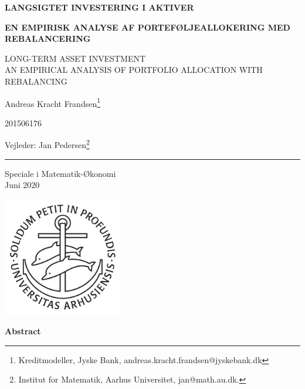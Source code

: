 \documentclass[
  a4paper,
  oneside]{memoir}
\author{}
\date{\vspace{-2.5em}}
\begin{document}
\begin{titlingpage}
\begin{center}
\LARGE \textbf{LANGSIGTET INVESTERING I AKTIVER}

\vspace{2mm}

\renewcommand{\thefootnote}{\fnsymbol{footnote}}
\large \textbf{EN EMPIRISK ANALYSE AF PORTEFØLJEALLOKERING MED REBALANCERING}

\tiny LONG-TERM ASSET INVESTMENT\\ AN EMPIRICAL ANALYSIS OF PORTFOLIO ALLOCATION WITH REBALANCING

\vspace{2mm}

\Large Andreas Kracht Frandsen\footnote{Kreditmodeller, Jyske Bank, andreas.kracht.frandsen@jyskebank.dk}

\Large 201506176

\Large Vejleder: Jan Pedersen\footnote{Institut for Matematik, Aarhus Universitet, jan@math.au.dk.}

\vspace{2mm}

\rule{1cm}{0.4pt}

\vspace{2mm}

Speciale i Matematik-Økonomi\\
Juni 2020

\vfill

\includegraphics[width=0.39\textwidth]{latex/ausegl_sort.pdf}

\vfill

\end{center}
\begin{center}
\textbf{Abstract}


\end{center}
\end{titlingpage}
\end{document}
